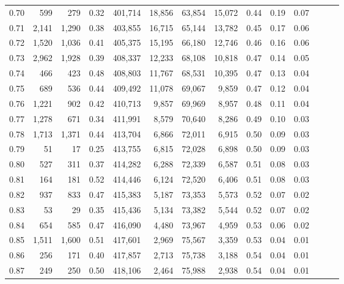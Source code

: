 \begin{tabular}{rrrrrrrrrrrrrr}
0.70 &     599 &    279 &  0.32 &  401,714 &   18,856 &  63,854 &  15,072 &  0.44 &  0.19 &      0.07 \\
0.71 &   2,141 &  1,290 &  0.38 &  403,855 &   16,715 &  65,144 &  13,782 &  0.45 &  0.17 &      0.06 \\
0.72 &   1,520 &  1,036 &  0.41 &  405,375 &   15,195 &  66,180 &  12,746 &  0.46 &  0.16 &      0.06 \\
0.73 &   2,962 &  1,928 &  0.39 &  408,337 &   12,233 &  68,108 &  10,818 &  0.47 &  0.14 &      0.05 \\
0.74 &     466 &    423 &  0.48 &  408,803 &   11,767 &  68,531 &  10,395 &  0.47 &  0.13 &      0.04 \\
0.75 &     689 &    536 &  0.44 &  409,492 &   11,078 &  69,067 &   9,859 &  0.47 &  0.12 &      0.04 \\
0.76 &   1,221 &    902 &  0.42 &  410,713 &    9,857 &  69,969 &   8,957 &  0.48 &  0.11 &      0.04 \\
0.77 &   1,278 &    671 &  0.34 &  411,991 &    8,579 &  70,640 &   8,286 &  0.49 &  0.10 &      0.03 \\
0.78 &   1,713 &  1,371 &  0.44 &  413,704 &    6,866 &  72,011 &   6,915 &  0.50 &  0.09 &      0.03 \\
0.79 &      51 &     17 &  0.25 &  413,755 &    6,815 &  72,028 &   6,898 &  0.50 &  0.09 &      0.03 \\
0.80 &     527 &    311 &  0.37 &  414,282 &    6,288 &  72,339 &   6,587 &  0.51 &  0.08 &      0.03 \\
0.81 &     164 &    181 &  0.52 &  414,446 &    6,124 &  72,520 &   6,406 &  0.51 &  0.08 &      0.03 \\
0.82 &     937 &    833 &  0.47 &  415,383 &    5,187 &  73,353 &   5,573 &  0.52 &  0.07 &      0.02 \\
0.83 &      53 &     29 &  0.35 &  415,436 &    5,134 &  73,382 &   5,544 &  0.52 &  0.07 &      0.02 \\
0.84 &     654 &    585 &  0.47 &  416,090 &    4,480 &  73,967 &   4,959 &  0.53 &  0.06 &      0.02 \\
0.85 &   1,511 &  1,600 &  0.51 &  417,601 &    2,969 &  75,567 &   3,359 &  0.53 &  0.04 &      0.01 \\
0.86 &     256 &    171 &  0.40 &  417,857 &    2,713 &  75,738 &   3,188 &  0.54 &  0.04 &      0.01 \\
0.87 &     249 &    250 &  0.50 &  418,106 &    2,464 &  75,988 &   2,938 &  0.54 &  0.04 &      0.01 \\

\end{tabular}
